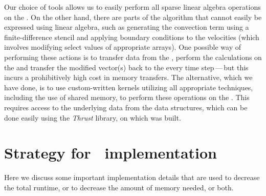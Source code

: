 Our choice of tools allows us to easily perform all sparse linear algebra operations on the {\gpu}. On the other hand, there are parts of the algorithm that cannot easily be expressed using linear algebra, such as generating the convection term using a finite-difference stencil and applying boundary conditions to the velocities (which involves modifying select values of appropriate arrays). One possible way of performing these actions is to transfer data from the {\gpu}, perform the calculations on the {\cpu} and transfer the modified vector(s) back to the {\gpu} every time step\,---\,but this incurs a prohibitively high cost in memory transfers. The alternative, which we have done, is to use custom-written {\cuda} kernels utilizing all appropriate techniques, including the use of shared memory, to perform these operations on the {\gpu}. This requires access to the underlying data from the {\cusp} data structures, which can be done easily using the \textsl{Thrust} library, on which {\cusp} was built. 


\section{Strategy for \gpu\ implementation}

Here we discuss some important implementation details that are used to decrease the total runtime, or to decrease the amount of memory needed, or both.


